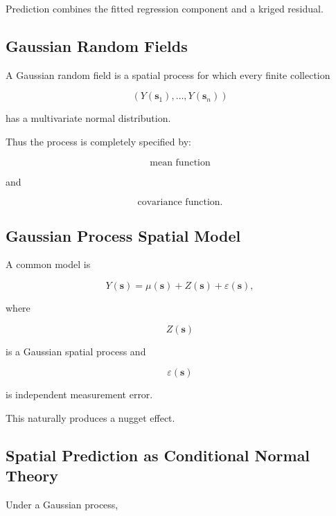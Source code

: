 Prediction combines the fitted regression component and a kriged
residual.

\subsection{Gaussian Random Fields}
\label{subsec:gaussian-random-fields}

A Gaussian random field is a spatial process for which every finite
collection

\[
\boxed{
(
Y(\mathbf{s}_1),
\ldots,
Y(\mathbf{s}_n)
)
}
\]

has a multivariate normal distribution.

Thus the process is completely specified by:

\[
\boxed{
\text{mean function}
}
\]

and

\[
\boxed{
\text{covariance function}.
}
\]

\subsection{Gaussian Process Spatial Model}
\label{subsec:gaussian-process-spatial}

A common model is

\[
\boxed{
Y(\mathbf{s})
=
\mu(\mathbf{s})
+
Z(\mathbf{s})
+
\varepsilon(\mathbf{s}),
}
\]

where

\[
Z(\mathbf{s})
\]

is a Gaussian spatial process and

\[
\varepsilon(\mathbf{s})
\]

is independent measurement error.

This naturally produces a nugget effect.

\subsection{Spatial Prediction as Conditional Normal Theory}
\label{subsec:spatial-conditional-normal}

Under a Gaussian process,

